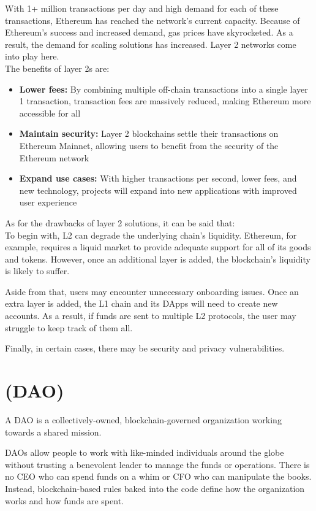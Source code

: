 \documentclass[MSE,Master,english]{twbook}%
\begin{document}
With 1+ million transactions per day and high demand for each of these transactions, Ethereum has reached the network's current capacity. Because of Ethereum's success and increased demand, gas prices have skyrocketed. As a result, the demand for scaling solutions has increased. Layer 2 networks come into play here. \\

The benefits of layer 2s are:
\begin{itemize}
  \item \textbf{Lower fees:} By combining multiple off-chain transactions into a single layer 1 transaction, transaction fees are massively reduced, making Ethereum more accessible for all
  \item \textbf{Maintain security:} Layer 2 blockchains settle their transactions on Ethereum Mainnet, allowing users to benefit from the security of the Ethereum network
  \item \textbf{Expand use cases:} With higher transactions per second, lower fees, and new technology, projects will expand into new applications with improved user experience
\end{itemize}

As for the drawbacks of layer 2 solutions, it can be said that: \\

To begin with, \gls{L2} can degrade the underlying chain's liquidity.\cite{l2Drawbacks} Ethereum, for example, requires a liquid market to provide adequate support for all of its goods and tokens. However, once an additional layer is added, the blockchain's liquidity is likely to suffer.

Aside from that, users may encounter unnecessary onboarding issues. Once an extra layer is added, the L1 chain and its \glspl{DApp} will need to create new accounts. As a result, if funds are sent to multiple \gls{L2} protocols, the user may struggle to keep track of them all.

Finally, in certain cases, there may be security and privacy vulnerabilities.

\section{ (DAO)}
A \gls{DAO}\cite{DAO} is a collectively-owned, blockchain-governed organization working towards a shared mission.

DAOs allow people to work with like-minded individuals around the globe\cite{DAO} without trusting a benevolent leader to manage the funds or operations. There is no CEO who can spend funds on a whim or CFO who can manipulate the books. Instead, blockchain-based rules baked into the code define how the organization works and how funds are spent.
\end{document}
